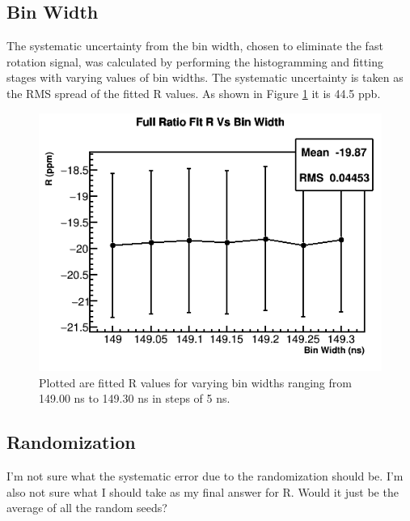 \subsection{Bin Width}

The systematic uncertainty from the bin width, chosen to eliminate the fast rotation signal, was calculated by performing the histogramming and fitting stages with varying values of bin widths. The systematic uncertainty is taken as the RMS spread of the fitted R values. As shown in Figure \ref{fig:BinWidth} it is 44.5 ppb.

\begin{figure}[]
	\centering
	\includegraphics[width=.6\textwidth]{BinWidthComparison}
    \caption[BinWidth]{Plotted are fitted R values for varying bin widths ranging from 149.00 ns to 149.30 ns in steps of 5 ns.}
    \label{fig:BinWidth}
\end{figure}

\subsection{Randomization}

I'm not sure what the systematic error due to the randomization should be. I'm also not sure what I should take as my final answer for R. Would it just be the average of all the random seeds?

